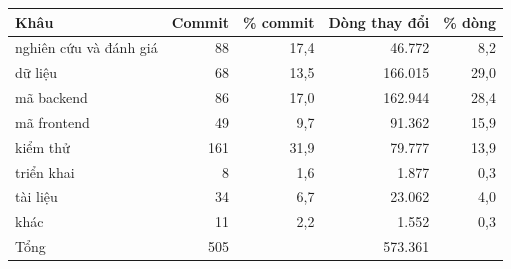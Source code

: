 \begin{tabular}{lrrrr}
\toprule
Khâu & Commit & \% commit & Dòng thay đổi & \% dòng \\
\midrule
nghiên cứu và đánh giá & 88 & 17,4 & 46.772 & 8,2 \\
dữ liệu & 68 & 13,5 & 166.015 & 29,0 \\
mã backend & 86 & 17,0 & 162.944 & 28,4 \\
mã frontend & 49 & 9,7 & 91.362 & 15,9 \\
kiểm thử & 161 & 31,9 & 79.777 & 13,9 \\
triển khai & 8 & 1,6 & 1.877 & 0,3 \\
tài liệu & 34 & 6,7 & 23.062 & 4,0 \\
khác & 11 & 2,2 & 1.552 & 0,3 \\
\midrule
Tổng & 505 &  & 573.361 &  \\
\bottomrule
\end{tabular}
